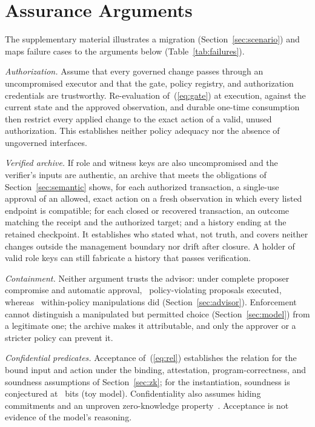 \section{Assurance Arguments}
\label{sec:assurance}
The supplementary material illustrates a migration (Section~\ref{sec:scenario}) and maps failure cases to the arguments below (Table~\ref{tab:failures}).

\emph{Authorization.} Assume that every governed change passes through an uncompromised executor and that the gate, policy registry, and authorization credentials are trustworthy. Re-evaluation of~(\ref{eq:gate}) at execution, against the current state and the approved observation, and durable one-time consumption then restrict every applied change to the exact action of a valid, unused authorization. This establishes neither policy adequacy nor the absence of ungoverned interfaces.

\emph{Verified archive.} If role and witness keys are also uncompromised and the verifier's inputs are authentic, an archive that meets the obligations of Section~\ref{sec:semantic} shows, for each authorized transaction, a single-use approval of an allowed, exact action on a fresh observation in which every listed endpoint is compatible; for each closed or recovered transaction, an outcome matching the receipt and the authorized target; and a history ending at the retained checkpoint. It establishes who stated what, not truth, and covers neither changes outside the management boundary nor drift after closure. A holder of valid role keys can still fabricate a history that passes verification.

\emph{Containment.} Neither argument trusts the advisor: under complete proposer compromise and automatic approval, \AdvCompViolExecuted\ policy-violating proposals executed, whereas \AdvCompInPolicyExecuted\ within-policy manipulations did (Section~\ref{sec:advisor}). Enforcement cannot distinguish a manipulated but permitted choice (Section~\ref{sec:model}) from a legitimate one; the archive makes it attributable, and only the approver or a stricter policy can prevent it.

\emph{Confidential predicates.} Acceptance of~(\ref{eq:rel}) establishes the relation for the bound input and action under the binding, attestation, program-correctness, and soundness assumptions of Section~\ref{sec:zk}; for the instantiation, soundness is conjectured at \ZkEndBits~bits (toy model). Confidentiality also assumes hiding commitments and an unproven zero-knowledge property~\cite{risc0sec}. Acceptance is not evidence of the model's reasoning.
